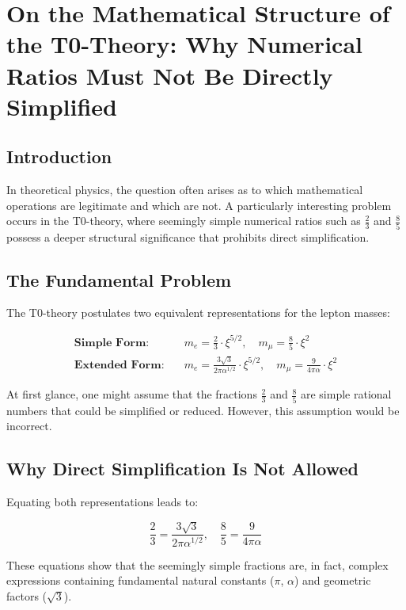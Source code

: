 \section*{On the Mathematical Structure of the T0-Theory: Why Numerical Ratios Must Not Be Directly Simplified}
	
	\subsection*{Introduction}
	
	In theoretical physics, the question often arises as to which mathematical operations are legitimate and which are not. A particularly interesting problem occurs in the T0-theory, where seemingly simple numerical ratios such as \(\frac{2}{3}\) and \(\frac{8}{5}\) possess a deeper structural significance that prohibits direct simplification.
	
	\subsection*{The Fundamental Problem}
	
	The T0-theory postulates two equivalent representations for the lepton masses:
	
	\begin{align*}
		\textbf{Simple Form:} &\quad m_e = \frac{2}{3} \cdot \xi^{5/2}, \quad m_\mu = \frac{8}{5} \cdot \xi^2 \\
		\textbf{Extended Form:} &\quad m_e = \frac{3\sqrt{3}}{2\pi\alpha^{1/2}} \cdot \xi^{5/2}, \quad m_\mu = \frac{9}{4\pi\alpha} \cdot \xi^2
	\end{align*}
	
	At first glance, one might assume that the fractions \(\frac{2}{3}\) and \(\frac{8}{5}\) are simple rational numbers that could be simplified or reduced. However, this assumption would be incorrect.
	
	\subsection*{Why Direct Simplification Is Not Allowed}
	
	Equating both representations leads to:
	
	\[
	\frac{2}{3} = \frac{3\sqrt{3}}{2\pi\alpha^{1/2}}, \quad \frac{8}{5} = \frac{9}{4\pi\alpha}
	\]
	
	These equations show that the seemingly simple fractions are, in fact, complex expressions containing fundamental natural constants (\(\pi\), \(\alpha\)) and geometric factors (\(\sqrt{3}\)).
	
